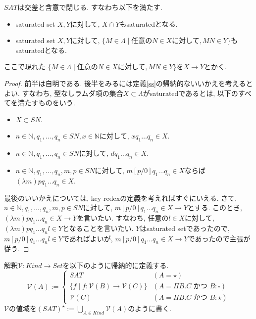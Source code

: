 \documentclass[12pt]{ltjsarticle}
\begin{document}
\begin{lem}
 $SAT$は交差と含意で閉じる. すなわち以下を満たす.
 \begin{itemize}
  \item saturated set $X, Y$に対して, $X \cap Y$もsaturatedとなる.
  \item saturated set $X, Y$に対して, $\{ M \in \Lambda \mid \text{任意の} N \in X \text{に対して}, M N \in Y\}$もsaturatedとなる.
 \end{itemize}
 ここで現れた $\{ M \in \Lambda \mid \text{任意の} N \in X \text{に対して}, M N \in Y\}$を$X \rightarrow Y$とかく.
\end{lem}
\begin{proof}
 前半は自明である.
 後半をみるには定義\ref{ss}の帰納的ないいかえを考えるとよい. すなわち, 
 型なしラムダ項の集合$X \subset \Lambda$がsaturatedであるとは, 以下のすべてを満たすものをいう.
 \begin{itemize}
  \item $X \subset SN$.
  \item $n \in \mathbb{N}, q_1, \ldots, q_n \in SN, x \in \mathbb{N}$に対して, $x q_1 \ldots q_n \in X$.
  \item $n \in \mathbb{N}, q_1, \ldots, q_n \in SN$に対して, $d q_1 \ldots q_n \in X$.
  \item $n \in \mathbb{N}, q_1, \ldots, q_n, m, p \in SN$に対して, $m[p/0]q_1 \ldots q_n \in X$ならば$(\lambda m)p q_1 \ldots q_n \in X$.
 \end{itemize}
最後のいいかえについては, key redexの定義を考えればすぐにいえる.
さて, $n \in \mathbb{N}, q_1, \ldots, q_n, m, p \in SN$に対して, $m[p/0]q_1 \ldots q_n \in X \rightarrow Y$とする. このとき, $(\lambda m)p q_1 \ldots q_n \in X \rightarrow Y$を言いたい.
すなわち, 任意の$l \in X$に対して, $(\lambda m)p q_1 \ldots q_n l \in Y$となることを言いたい.
 $Y$はsaturated setであったので, $m[p/0] q_1 \ldots q_n l \in Y$であればよいが, 
 $m[p/0]q_1 \ldots q_n \in X \rightarrow Y$であったので主張が従う.
\end{proof}

\begin{defn}
 解釈$\mathcal{V} : Kind \rightarrow Set$を以下のように帰納的に定義する. 
\[
  \mathcal{V} (A) := \begin{cases}
    SAT & (A = \star) \\
    \{ f \mid f : \mathcal{V}(B) \rightarrow \mathcal{V}(C) \} & (A = \Pi B. C \text{ かつ }B : \square) \\
    \mathcal{V} (C) & (A = \Pi B. C  \text{ かつ }B : \star)
  \end{cases}
\]
 $\mathcal{V}$の値域を$(SAT)^\star := \bigcup_{A \in Kind} \mathcal{V}(A)$のように書く.
\end{defn}
\end{document}

